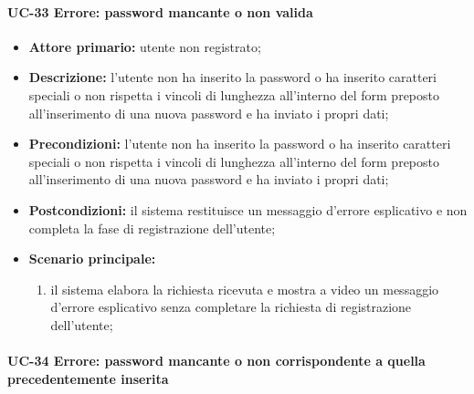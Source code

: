 \paragraph{UC-33 Errore: password mancante o non valida}

	\begin{itemize}
		\item \textbf{Attore primario:} utente non registrato;

		\item \textbf{Descrizione:} l'utente non ha inserito la password o ha inserito caratteri speciali o non rispetta i vincoli di lunghezza all'interno del form preposto all'inserimento di una nuova password e ha inviato i propri dati;

		\item \textbf{Precondizioni:} l'utente non ha inserito la password o ha inserito caratteri speciali o non rispetta i vincoli di lunghezza all'interno del form preposto all'inserimento di una nuova password e ha inviato i propri dati;

		\item \textbf{Postcondizioni:} il sistema restituisce un messaggio d'errore esplicativo e non completa la fase di registrazione dell'utente;

		\item \textbf{Scenario principale:}
	  		\begin{enumerate}
		  		\item il sistema elabora la richiesta ricevuta e mostra a video un messaggio d'errore esplicativo senza completare la richiesta di registrazione dell'utente; 
	  		\end{enumerate}
	\end{itemize}


\paragraph{UC-34 Errore: password mancante o non corrispondente a quella precedentemente inserita}

